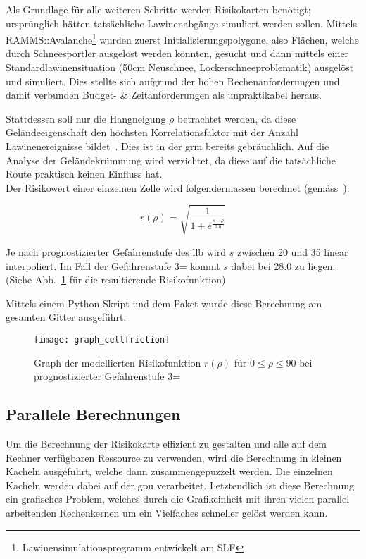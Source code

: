 Als Grundlage für alle weiteren Schritte werden Risikokarten benötigt; ursprünglich hätten tatsächliche Lawinenabgänge simuliert werden sollen. Mittels RAMMS::Avalanche\footnote{Lawinensimulationsprogramm entwickelt am SLF} wurden zuerst Initialisierungspolygone, also Flächen, welche durch Schneesportler ausgelöst werden könnten, gesucht und dann mittels einer Standardlawinensituation (50cm Neuschnee, Lockerschneeproblematik) ausgelöst und simuliert. Dies stellte sich aufgrund der hohen Rechenanforderungen und damit verbunden Budget- \& Zeitanforderungen als unpraktikabel heraus.

Stattdessen soll nur die Hangneigung $\rho$ betrachtet werden, da diese Geländeeigenschaft den höchsten Korrelationsfaktor mit der Anzahl Lawinenereignisse bildet~\cite{arpddatasetdocs}. Dies ist in der \gls{grm} bereits gebräuchlich. Auf die Analyse der Geländekrümmung wird verzichtet, da diese auf die tatsächliche Route praktisch keinen Einfluss hat.\\
Der Risikowert einer einzelnen Zelle wird folgendermassen berechnet (gemäss~\citeauthor{sacbergspwinterp99})\cite{sacbergspwinterp99}:

\[
r(\rho) = \sqrt{\frac{1}{1 + e^{\frac{s-\rho}{3.0}}}}
\]

Je nach prognostizierter Gefahrenstufe des \gls{llb} wird $s$ zwischen 20 und 35 linear interpoliert. Im Fall der Gefahrenstufe 3= kommt $s$ dabei bei 28.0 zu liegen. (Siehe Abb.~\ref{fig:graph} für die resultierende Risikofunktion)

Mittels einem Python-Skript und dem Paket  wurde diese Berechnung am gesamten Gitter ausgeführt.

\begin{figure}[H]
  \centering
  \texttt{[image: graph\_cellfriction]}
  \caption{Graph der modellierten Risikofunktion $r(\rho)$ für $0 \leq \rho \leq 90$ bei prognostizierter Gefahrenstufe 3=}\label{fig:graph}
\end{figure}

\subsection{Parallele Berechnungen}

Um die Berechnung der Risikokarte effizient zu gestalten und alle auf dem Rechner verfügbaren Ressource zu verwenden, wird die Berechnung in kleinen Kacheln ausgeführt, welche dann zusammengepuzzelt werden. Die einzelnen Kacheln werden dabei auf der \acrshort{gpu} verarbeitet. Letztendlich ist diese Berechnung ein grafisches Problem, welches durch die Grafikeinheit mit ihren vielen parallel arbeitenden Rechenkernen um ein Vielfaches schneller gelöst werden kann.

